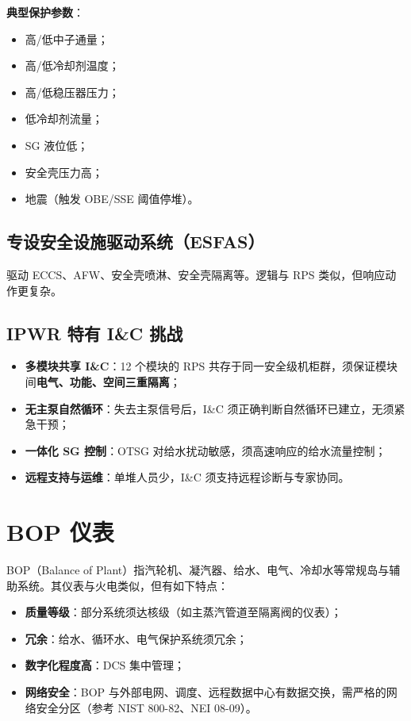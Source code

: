 \documentclass[
  UTF8,
  scheme=plain,
  fontsize=10pt,
  openany
]{ctexbook}
\begin{document}
\textbf{典型保护参数}：

\begin{itemize}
\tightlist
\item
  高/低中子通量；
\item
  高/低冷却剂温度；
\item
  高/低稳压器压力；
\item
  低冷却剂流量；
\item
  SG 液位低；
\item
  安全壳压力高；
\item
  地震（触发 OBE/SSE 阈值停堆）。
\end{itemize}

\subsection{专设安全设施驱动系统（ESFAS）}\label{ux4e13ux8bbeux5b89ux5168ux8bbeux65bdux9a71ux52a8ux7cfbux7edfesfas}

驱动 ECCS、AFW、安全壳喷淋、安全壳隔离等。逻辑与 RPS
类似，但响应动作更复杂。

\subsection{IPWR 特有 I\&C
挑战}\label{ipwr-ux7279ux6709-ic-ux6311ux6218}

\begin{itemize}
\tightlist
\item
  \textbf{多模块共享 I\&C}：12 个模块的 RPS
  共存于同一安全级机柜群，须保证模块间\textbf{电气、功能、空间三重隔离}；
\item
  \textbf{无主泵自然循环}：失去主泵信号后，I\&C
  须正确判断自然循环已建立，无须紧急干预；
\item
  \textbf{一体化 SG 控制}：OTSG
  对给水扰动敏感，须高速响应的给水流量控制；
\item
  \textbf{远程支持与运维}：单堆人员少，I\&C 须支持远程诊断与专家协同。
\end{itemize}

\section{BOP 仪表}\label{bop-ux4eeaux8868}

BOP（Balance of
Plant）指汽轮机、凝汽器、给水、电气、冷却水等常规岛与辅助系统。其仪表与火电类似，但有如下特点：

\begin{itemize}
\tightlist
\item
  \textbf{质量等级}：部分系统须达核级（如主蒸汽管道至隔离阀的仪表）；
\item
  \textbf{冗余}：给水、循环水、电气保护系统须冗余；
\item
  \textbf{数字化程度高}：DCS 集中管理；
\item
  \textbf{网络安全}：BOP
  与外部电网、调度、远程数据中心有数据交换，需严格的网络安全分区（参考
  NIST 800-82、NEI 08-09）。
\end{itemize}
\end{document}
